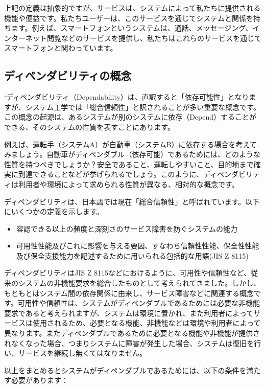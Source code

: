 上記の定義は抽象的ですが、サービスは、システムによって私たちに提供される機能や便益です。私たちユーザーは、このサービスを通じてシステムと関係を持ちます。例えば、スマートフォンというシステムは、通話、メッセージング、インターネット閲覧などのサービスを提供し、私たちはこれらのサービスを通じてスマートフォンと関わっています。

\subsection{ディペンダビリティの概念}
`ディペンダビリティ（Dependability）は、直訳すると「依存可能性」となりますが、システム工学では「総合信頼性」と訳されることが多い重要な概念です。この概念の起源は、あるシステムが別のシステムに依存（Depend）することができる、そのシステムの性質を表すことにあります。

例えば、運転手（システムA）が自動車（システムB）に依存する場合を考えてみましょう。自動車がディペンダブル（依存可能）であるためには、どのような性質を持つべきでしょうか？安全であること、運転しやすいこと、目的地まで確実に到達できることなどが挙げられるでしょう。このように、ディペンダビリティは利用者や環境によって求められる性質が異なる、相対的な概念です。

ディペンダビリティは、日本語では現在「総合信頼性」と呼ばれています。以下にいくつかの定義を示します。

\begin{itemize}
\item 容認できる以上の頻度と深刻さのサービス障害を防ぐシステムの能力
\item 可用性性能及びこれに影響を与える要因、すなわち信頼性性能、保全性性能及び保全支援能力を記述するために用いられる包括的な用語(JIS Z 8115)
\end{itemize}

ディペンダビリティはJIS Z 8115などにおけるように、可用性や信頼性など、従来のシステムの非機能要求を総合したものとして考えられてきました。しかし、もともとはシステム間の依存関係に由来し、サービス障害などに関連する概念です。可用性や信頼性は、システムがディペンダブルであるためには必要な非機能要求であると考えられますが、システムは環境に置かれ、また利用者によってサービスは使用されるため、必要となる機能、非機能などは環境や利用者によって異なります。またディペンダブルであるために必要となる機能や非機能が提供されなくなった場合、つまりシステムに障害が発生した場合、システムは復旧を行い、サービスを継続し無くてはなりません。

以上をまとめるとシステムがディペンダブルであるためには、以下の条件を満たす必要があります：

